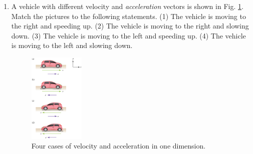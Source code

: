 \documentclass{article}
\begin{document}
\begin{enumerate}
\item A vehicle with different velocity and \textit{acceleration} vectors is shown in Fig. \ref{fig:vehicle_v_a}.  Match the pictures to the following statements.  (1) The vehicle is moving to the right and speeding up.  (2) The vehicle is moving to the right and slowing down.  (3) The vehicle is moving to the left and speeding up. (4) The vehicle is moving to the left and slowing down.
\begin{figure}[hb]
\centering
\includegraphics[width=0.25\textwidth]{figures/vehicle_v_a.jpeg}
\caption{\label{fig:vehicle_v_a} Four cases of velocity and acceleration in one dimension.}
\end{figure}
\end{enumerate}
\end{document}
